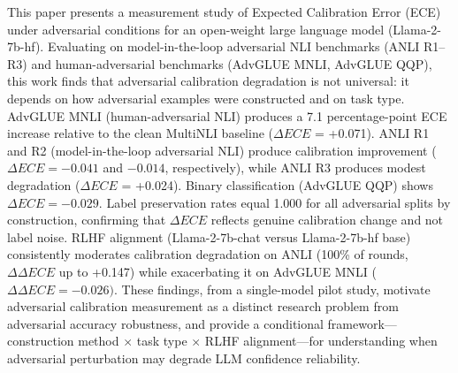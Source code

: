 
This paper presents a measurement study of Expected Calibration Error (ECE) under adversarial conditions for an open-weight large language model (Llama-2-7b-hf). Evaluating on model-in-the-loop adversarial NLI benchmarks (ANLI R1--R3) and human-adversarial benchmarks (AdvGLUE MNLI, AdvGLUE QQP), this work finds that adversarial calibration degradation is not universal: it depends on how adversarial examples were constructed and on task type. AdvGLUE MNLI (human-adversarial NLI) produces a 7.1 percentage-point ECE increase relative to the clean MultiNLI baseline ($\Delta ECE$ = +0.071). ANLI R1 and R2 (model-in-the-loop adversarial NLI) produce calibration improvement ($\Delta ECE = -0.041$ and $-0.014$, respectively), while ANLI R3 produces modest degradation ($\Delta ECE$ = +0.024). Binary classification (AdvGLUE QQP) shows $\Delta ECE = -0.029$. Label preservation rates equal 1.000 for all adversarial splits by construction, confirming that $\Delta ECE$ reflects genuine calibration change and not label noise. RLHF alignment (Llama-2-7b-chat versus Llama-2-7b-hf base) consistently moderates calibration degradation on ANLI (100\% of rounds, $\Delta \Delta ECE$ up to +0.147) while exacerbating it on AdvGLUE MNLI ($\Delta \Delta ECE = -0.026)$. These findings, from a single-model pilot study, motivate adversarial calibration measurement as a distinct research problem from adversarial accuracy robustness, and provide a conditional framework---construction method $\times$ task type $\times$ RLHF alignment---for understanding when adversarial perturbation may degrade LLM confidence reliability.

